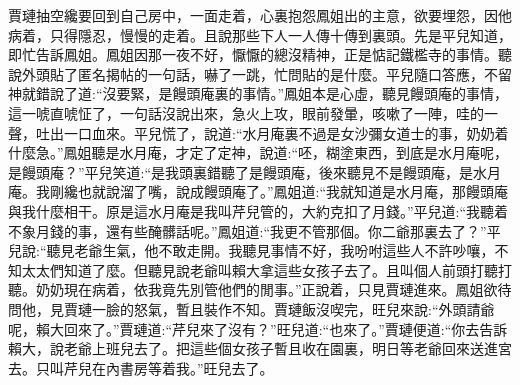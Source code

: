 \begin{parag}
    賈璉抽空纔要回到自己房中，一面走着，心裏抱怨鳳姐出的主意，欲要埋怨，因他病着，只得隱忍，慢慢的走着。且說那些下人一人傳十傳到裏頭。先是平兒知道，即忙告訴鳳姐。鳳姐因那一夜不好，懨懨的總沒精神，正是惦記鐵檻寺的事情。聽說外頭貼了匿名揭帖的一句話，嚇了一跳，忙問貼的是什麼。平兒隨口答應，不留神就錯說了道:“沒要緊，是饅頭庵裏的事情。”鳳姐本是心虛，聽見饅頭庵的事情，這一唬直唬怔了，一句話沒說出來，急火上攻，眼前發暈，咳嗽了一陣，哇的一聲，吐出一口血來。平兒慌了，說道:“水月庵裏不過是女沙彌女道士的事，奶奶着什麼急。”鳳姐聽是水月庵，才定了定神，說道:“呸，糊塗東西，到底是水月庵呢，是饅頭庵？”平兒笑道:“是我頭裏錯聽了是饅頭庵，後來聽見不是饅頭庵，是水月庵。我剛纔也就說溜了嘴，說成饅頭庵了。”鳳姐道:“我就知道是水月庵，那饅頭庵與我什麼相干。原是這水月庵是我叫芹兒管的，大約克扣了月錢。”平兒道:“我聽着不象月錢的事，還有些醃髒話呢。”鳳姐道:“我更不管那個。你二爺那裏去了？”平兒說:“聽見老爺生氣，他不敢走開。我聽見事情不好，我吩咐這些人不許吵嚷，不知太太們知道了麼。但聽見說老爺叫賴大拿這些女孩子去了。且叫個人前頭打聽打聽。奶奶現在病着，依我竟先別管他們的閒事。”正說着，只見賈璉進來。鳳姐欲待問他，見賈璉一臉的怒氣，暫且裝作不知。賈璉飯沒喫完，旺兒來說:“外頭請爺呢，賴大回來了。”賈璉道:“芹兒來了沒有？”旺兒道:“也來了。”賈璉便道:“你去告訴賴大，說老爺上班兒去了。把這些個女孩子暫且收在園裏，明日等老爺回來送進宮去。只叫芹兒在內書房等着我。”旺兒去了。
\end{parag}


